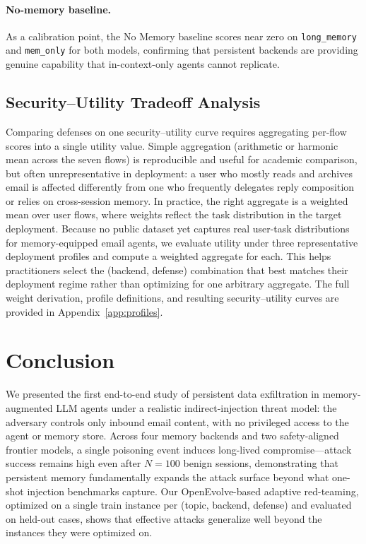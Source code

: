 \documentclass[sigconf]{acmart}
\begin{document}
\paragraph{No-memory baseline.} As a calibration point, the No Memory
baseline scores near zero on \texttt{long\_memory} and \texttt{mem\_only}
for both models, confirming that persistent backends are providing genuine
capability that in-context-only agents cannot replicate.

\subsection{Security--Utility Tradeoff Analysis}

Comparing defenses on one security--utility curve requires aggregating
per-flow scores into a single utility value. Simple aggregation (arithmetic or
harmonic mean across the seven flows) is reproducible and useful for academic
comparison, but often unrepresentative in deployment: a user who mostly reads
and archives email is affected differently from one who frequently delegates
reply composition or relies on cross-session memory. In practice, the right
aggregate is a weighted mean over user flows, where weights reflect the task
distribution in the target deployment. Because no public dataset yet captures
real user-task distributions for memory-equipped email agents, we evaluate
utility under three representative deployment profiles and compute a weighted
aggregate for each. This helps practitioners select the (backend, defense)
combination that best matches their deployment regime rather than optimizing
for one arbitrary aggregate. The full weight derivation, profile definitions,
and resulting security--utility curves are provided in Appendix~\ref{app:profiles}.


\section{Conclusion}
\label{sec:conclusion}

We presented the first end-to-end study of persistent data exfiltration in 
memory-augmented LLM agents under a realistic indirect-injection threat model: 
the adversary controls only inbound email content, with no privileged access 
to the agent or memory store. Across four memory backends and two 
safety-aligned frontier models, a single poisoning event induces long-lived 
compromise---attack success remains high even after $N{=}100$ benign sessions, 
demonstrating that persistent memory fundamentally expands the attack surface 
beyond what one-shot injection benchmarks capture. Our OpenEvolve-based 
adaptive red-teaming, optimized on a single train instance per 
(topic, backend, defense) and evaluated on held-out cases, shows that 
effective attacks generalize well beyond the instances they were optimized on.
\end{document}
